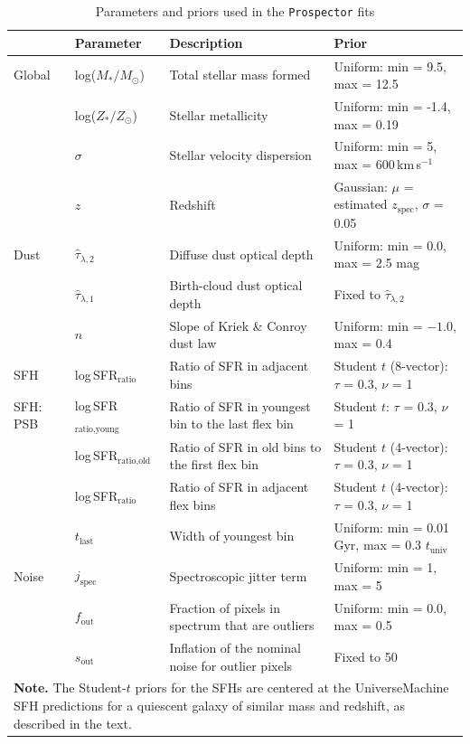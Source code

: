 \documentclass[twocolumn, astrosymb]{aastex631}
\newcommand{\white}{\textcolor{white}}
\begin{document}
\begin{table}[t]
\centering
\caption{Parameters and priors used in the \texttt{Prospector} fits\label{tab:prosp_priors}}
\begin{tabular}{p{} p{} p{} p{}}
\hline \hline
& Parameter & Description & Prior \\
\hline
Global    & log($M_{*}/M_{\odot}$) & Total stellar mass formed & Uniform: min = 9.5, max = 12.5\\[2pt]
\white{.} & log($Z_{*}/Z_{\odot}$) & Stellar metallicity & Uniform: min = -1.4, max = 0.19\\[2pt]
\white{.} & $\sigma$ & Stellar velocity dispersion & Uniform: min = 5, max = 600\,km\,s$^{-1}$\\[2pt]
\white{.} & $z$ & Redshift & Gaussian: $\mu$ = estimated $z_{\text{spec}}$, $\sigma$ = 0.05 \\[2pt]
Dust      & $\hat{\tau}_{\lambda,2}$ & Diffuse dust optical depth& Uniform: min = 0.0, max = 2.5 mag \\[2pt]
\white{.} & $\hat{\tau}_{\lambda,1}$ & Birth-cloud dust optical depth& Fixed to $\hat{\tau}_{\lambda,2}$ \\[2pt]
\white{.} & $n$ &Slope of Kriek \& Conroy dust law&Uniform: min = $-1.0$, max = 0.4\\[2pt]
SFH       & log\,SFR$_{\text{ratio}}$ & Ratio of SFR in adjacent bins & Student $t$ (8-vector): $\tau$ = 0.3, $\nu$ = 1\\[2pt]
SFH: PSB  & log\,SFR$_{\text{ratio,young}}$ & Ratio of SFR in youngest bin to the last flex bin & Student $t$: $\tau$ = 0.3, $\nu$ = 1\\[2pt]
\white{.} & log\,SFR$_{\text{ratio,old}}$ & Ratio of SFR in old bins to the first flex bin & Student $t$ (4-vector): $\tau$ = 0.3, $\nu$ = 1\\[2pt]
\white{.} & log\,SFR$_{\text{ratio}}$ & Ratio of SFR in adjacent flex bins &  Student $t$ (4-vector): $\tau$ = 0.3, $\nu$ = 1\\[2pt]
\white{.} & $t_{\text{last}}$ & Width of youngest bin & Uniform: min = 0.01\,Gyr, max = 0.3 $t_{\text{univ}}$\\[2pt]
Noise     & $j_{\text{spec}}$ & Spectroscopic jitter term & Uniform: min = 1, max = 5\\[2pt]
\white{.} & $f_{\text{out}}$ & Fraction of pixels in spectrum that are outliers & Uniform: min = 0.0, max = 0.5\\[2pt]
\white{.} & $s_{\text{out}}$ & Inflation of the nominal noise for outlier pixels & Fixed to 50\\[2pt]
\hline 
\multicolumn{4}{p{0.95\textwidth}}{\textbf{Note.} The Student-$t$ priors for the SFHs are centered at the UniverseMachine SFH predictions for a quiescent galaxy of similar mass and redshift, as described in the text.}
\end{tabular}
\end{table}
\end{document}
